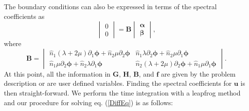 \documentclass[12pt]{article}
\begin{document}
The boundary conditions can also be expressed in terms of the spectral
coefficients as
\begin{equation}
\begin{vmatrix}
  0\\
  0
\end{vmatrix} =
\boldsymbol{B}
\begin{vmatrix}
  \boldsymbol{\alpha}\\
  \boldsymbol{\beta}
\end{vmatrix},
\end{equation}
where
\begin{equation}
\boldsymbol{B} = 
\begin{vmatrix}
 \hat{n}_1(\lambda + 2\mu)\partial_1 \boldsymbol{\phi} +  
 \hat{n}_2\mu\partial_2 \boldsymbol{\phi} &
 \hat{n}_1\lambda\partial_2 \boldsymbol{\phi} +  
 \hat{n}_2\mu\partial_1 \boldsymbol{\phi}\\
 \hat{n}_1\mu\partial_2 \boldsymbol{\phi} +  
 \hat{n}_2\lambda\partial_1 \boldsymbol{\phi} &
 \hat{n}_2(\lambda + 2\mu)\partial_2 \boldsymbol{\phi} +  
 \hat{n}_1\mu\partial_1 \boldsymbol{\phi}
\end{vmatrix}.
\end{equation}
At this point, all the information in $\boldsymbol{G}$,
$\boldsymbol{H}$, $\boldsymbol{B}$, and $\boldsymbol{f}$ are given by
the problem description or are user defined variables.  Finding the
spectral coefficients for $\boldsymbol{u}$ is then straight-forward.
We perform the time integration with a leapfrog method and our
procedure for solving eq. (\ref{DiffEq}) is as follows:
\end{document}
